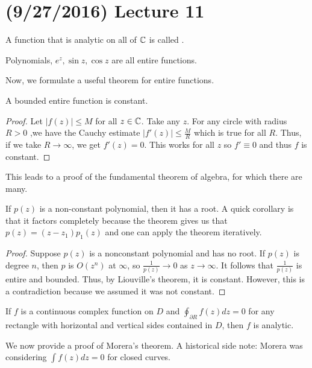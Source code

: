 \documentclass[11pt,leqno,oneside]{amsart}
\numberwithin{thm}{section}
\begin{document}
  \section{(9/27/2016) Lecture 11}
  \begin{defn}
    A function that is analytic on all of ${\mathbb C}$ is called .
  \end{defn}
  \begin{example}
    Polynomials, $e^z, \sin z, \cos z$ are all entire functions.
  \end{example}
  Now, we formulate a useful theorem for entire functions.
  \begin{thm}
    A bounded entire function is constant.
  \end{thm}
  \begin{proof}
    Let $|f(z)| \leq M$ for all $z \in {\mathbb C}$. Take any $z$. For any
    circle with radius $R >
    0$ ,we have the Cauchy estimate $|f'(z)| \leq \frac{M}{R}$ which
    is true for all $R$. Thus, if we take $R \to \infty$, we get
    $f'(z) = 0$. This works for all $z$ so $f' \equiv 0$ and thus $f$
    is constant.
  \end{proof}
  This leads to a proof of the fundamental theorem of algebra, for
  which there are many.
  \begin{thm}
    If $p(z)$ is a non-constant polynomial, then it has a root. A
    quick corollary is that it factors completely because the theorem
    gives us that $p(z) = (z-z_1)p_1(z)$ and one can apply the theorem iteratively.
  \end{thm}
  \begin{proof}
    Suppose $p(z)$ is a nonconstant polynomial and has no root. If
    $p(z)$ is degree $n$, then $p$ is $O(z^n)$ at $\infty$, so
    $\frac{1}{p(z)} \to 0$ as $z \to \infty$. It follows that
    $\frac{1}{p(z)}$ is entire and bounded. Thus, by Liouville's
    theorem, it is constant. However, this is a contradiction because
    we assumed it was not constant.
  \end{proof}
  \begin{thm}
    If $f$ is a continuous complex function on $D$ and
    $\oint_{\partial R} f(z)dz = 0$ for any rectangle with horizontal
    and vertical sides contained in $D$, then $f$ is analytic.
  \end{thm}
  We now provide a proof of Morera's theorem. A historical side note:
  Morera was considering $\int f(z)dz = 0$ for closed curves.
\end{document}
